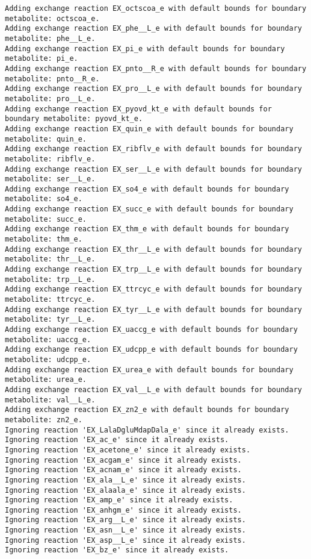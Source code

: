 \documentclass[
  letterpaper,
  DIV=11,
  numbers=noendperiod]{scrartcl}
\begin{document}
\begin{verbatim}
Adding exchange reaction EX_octscoa_e with default bounds for boundary metabolite: octscoa_e.
Adding exchange reaction EX_phe__L_e with default bounds for boundary metabolite: phe__L_e.
Adding exchange reaction EX_pi_e with default bounds for boundary metabolite: pi_e.
Adding exchange reaction EX_pnto__R_e with default bounds for boundary metabolite: pnto__R_e.
Adding exchange reaction EX_pro__L_e with default bounds for boundary metabolite: pro__L_e.
Adding exchange reaction EX_pyovd_kt_e with default bounds for boundary metabolite: pyovd_kt_e.
Adding exchange reaction EX_quin_e with default bounds for boundary metabolite: quin_e.
Adding exchange reaction EX_ribflv_e with default bounds for boundary metabolite: ribflv_e.
Adding exchange reaction EX_ser__L_e with default bounds for boundary metabolite: ser__L_e.
Adding exchange reaction EX_so4_e with default bounds for boundary metabolite: so4_e.
Adding exchange reaction EX_succ_e with default bounds for boundary metabolite: succ_e.
Adding exchange reaction EX_thm_e with default bounds for boundary metabolite: thm_e.
Adding exchange reaction EX_thr__L_e with default bounds for boundary metabolite: thr__L_e.
Adding exchange reaction EX_trp__L_e with default bounds for boundary metabolite: trp__L_e.
Adding exchange reaction EX_ttrcyc_e with default bounds for boundary metabolite: ttrcyc_e.
Adding exchange reaction EX_tyr__L_e with default bounds for boundary metabolite: tyr__L_e.
Adding exchange reaction EX_uaccg_e with default bounds for boundary metabolite: uaccg_e.
Adding exchange reaction EX_udcpp_e with default bounds for boundary metabolite: udcpp_e.
Adding exchange reaction EX_urea_e with default bounds for boundary metabolite: urea_e.
Adding exchange reaction EX_val__L_e with default bounds for boundary metabolite: val__L_e.
Adding exchange reaction EX_zn2_e with default bounds for boundary metabolite: zn2_e.
Ignoring reaction 'EX_LalaDgluMdapDala_e' since it already exists.
Ignoring reaction 'EX_ac_e' since it already exists.
Ignoring reaction 'EX_acetone_e' since it already exists.
Ignoring reaction 'EX_acgam_e' since it already exists.
Ignoring reaction 'EX_acnam_e' since it already exists.
Ignoring reaction 'EX_ala__L_e' since it already exists.
Ignoring reaction 'EX_alaala_e' since it already exists.
Ignoring reaction 'EX_amp_e' since it already exists.
Ignoring reaction 'EX_anhgm_e' since it already exists.
Ignoring reaction 'EX_arg__L_e' since it already exists.
Ignoring reaction 'EX_asn__L_e' since it already exists.
Ignoring reaction 'EX_asp__L_e' since it already exists.
Ignoring reaction 'EX_bz_e' since it already exists.

\end{verbatim}
\end{document}
